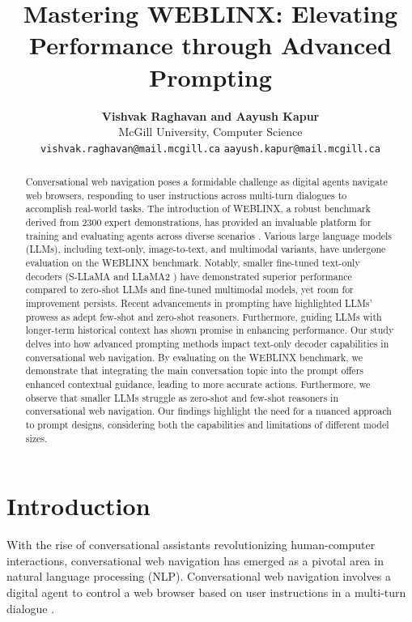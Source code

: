 \documentclass[11pt]{article}
\title{Mastering WEBLINX: Elevating Performance through Advanced Prompting}
\author{\textbf{Vishvak Raghavan and Aayush Kapur} \\
  McGill University, Computer Science \\
  \texttt{vishvak.raghavan@mail.mcgill.ca}
  \texttt{aayush.kapur@mail.mcgill.ca}}
\begin{document}
\linenumbers

\maketitle
\begin{abstract}
Conversational web navigation poses a formidable challenge as digital agents navigate web browsers, responding to user instructions across multi-turn dialogues to accomplish real-world tasks. The introduction of WEBLINX, a robust benchmark derived from 2300 expert demonstrations, has provided an invaluable platform for training and evaluating agents across diverse scenarios \cite{lxinghan_2024_weblinx}. Various large language models (LLMs), including text-only, image-to-text, and multimodal variants, have undergone evaluation on the WEBLINX benchmark. Notably, smaller fine-tuned text-only decoders (S-LLaMA \cite{xia_2023_sheared_llama} and LLaMA2 \cite{touvron_2023_llama_2}) have demonstrated superior performance compared to zero-shot LLMs and fine-tuned multimodal models, yet room for improvement persists. Recent advancements in prompting have highlighted LLMs' prowess as adept few-shot and zero-shot reasoners. Furthermore, guiding LLMs with longer-term historical context has shown promise in enhancing performance. Our study delves into how advanced prompting methods impact text-only decoder capabilities in conversational web navigation. By evaluating on the WEBLINX benchmark, we demonstrate that integrating the main conversation topic into the prompt offers enhanced contextual guidance, leading to more accurate actions. Furthermore, we observe that smaller LLMs struggle as zero-shot and few-shot reasoners in conversational web navigation. Our findings highlight the need for a nuanced approach to prompt designs, considering both the capabilities and limitations of different model sizes.
\end{abstract}

\section{Introduction}

With the rise of conversational assistants revolutionizing human-computer interactions, conversational web navigation has emerged as a pivotal area in natural language processing (NLP). Conversational web navigation involves a digital agent to control a web browser based on user instructions in a multi-turn dialogue \cite{lxinghan_2024_weblinx}.
\end{document}
